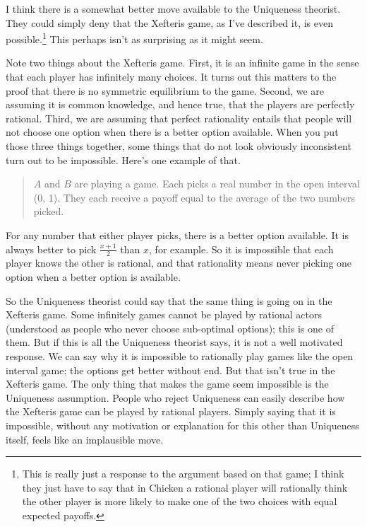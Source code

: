 \documentclass[12pt,]{article}
\let\rmarkdownfootnote\footnote%
\def\footnote{\protect\rmarkdownfootnote}
\begin{document}
I think there is a somewhat better move available to the Uniqueness theorist. They could simply deny that the Xefteris game, as I've described it, is even possible.\footnote{This is really just a response to the argument based on that game; I think they just have to say that in Chicken a rational player will rationally think the other player is more likely to make one of the two choices with equal expected payoffs.} This perhaps isn't as surprising as it might seem.

Note two things about the Xefteris game. First, it is an infinite game in the sense that each player has infinitely many choices. It turns out this matters to the proof that there is no symmetric equilibrium to the game. Second, we are assuming it is common knowledge, and hence true, that the players are perfectly rational. Third, we are assuming that perfect rationality entails that people will not choose one option when there is a better option available. When you put those three things together, some things that do not look obviously inconsistent turn out to be impossible. Here's one example of that.

\begin{quote}
\(A\) and \(B\) are playing a game. Each picks a real number in the open interval (0, 1). They each receive a payoff equal to the average of the two numbers picked.
\end{quote}

For any number that either player picks, there is a better option available. It is always better to pick \(\frac{x+1}{2}\) than \(x\), for example. So it is impossible that each player knows the other is rational, and that rationality means never picking one option when a better option is available.

So the Uniqueness theorist could say that the same thing is going on in the Xefteris game. Some infinitely games cannot be played by rational actors (understood as people who never choose sub-optimal options); this is one of them. But if this is all the Uniqueness theorist says, it is not a well motivated response. We can say why it is impossible to rationally play games like the open interval game; the options get better without end. But that isn't true in the Xefteris game. The only thing that makes the game seem impossible is the Uniqueness assumption. People who reject Uniqueness can easily describe how the Xefteris game can be played by rational players. Simply saying that it is impossible, without any motivation or explanation for this other than Uniqueness itself, feels like an implausible move.
\end{document}
